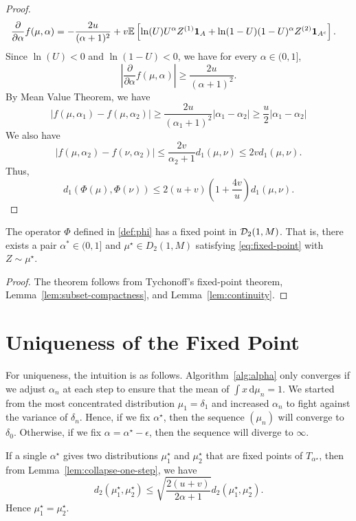 \begin{proof}
\begin{align*}
    \dfrac{\partial}{\partial \alpha} f(\mu, \alpha)
     & = -\dfrac{2u}{(\alpha+1)^2} + v\mathbb{E}\left[\ln(U) U^\alpha Z^{(1)} \mathbf{1}_A + \ln(1-U) (1-U)^\alpha Z^{(2)} \mathbf{1}_{A^c}\right].
  \end{align*}
  Since $\ln(U) < 0$ and $\ln(1-U) < 0$, we have for every $\alpha\in(0,1]$,
  $$\left|\dfrac{\partial}{\partial \alpha} f(\mu, \alpha)\right| \ge \dfrac{2u}{(\alpha+1)^2}.$$
  By Mean Value Theorem, we have
  $$|f(\mu, \alpha_1) - f(\mu, \alpha_2)| \ge \dfrac{2u}{(\alpha_1+1)^2}|\alpha_1 - \alpha_2|\ge \dfrac{u}{2}|\alpha_1 - \alpha_2|$$
  We also have
  $$|f(\mu, \alpha_2) - f(\nu, \alpha_2)| \le \dfrac{2v}{\alpha_2+1}d_1(\mu, \nu) \le 2v d_1(\mu, \nu).$$
  Thus,
  $$d_1(\Phi(\mu), \Phi(\nu)) \le 2(u+v)\left(1+\dfrac{4v}{u}\right)d_1(\mu, \nu).$$
\end{proof}

\begin{theorem}
  The operator $\Phi$ defined in \ref{def:phi} has a fixed point in $\mathcal{D}_2(1, M)$. That is, there exists a pair $\alpha^*\in (0,1]$ and $\mu^\star\in D_2(1,M)$ satisfying \eqref{eq:fixed-point} with $Z\sim\mu^\star$.
\end{theorem}

\begin{proof}
  The theorem follows from Tychonoff's fixed-point theorem, Lemma~\ref{lem:subset-compactness}, and Lemma~\ref{lem:continuity}.
\end{proof}

\section{Uniqueness of the Fixed Point}

For uniqueness, the intuition is as follows. Algorithm~\ref{alg:alpha} only converges if we adjust $\alpha_n$ at each step to ensure that the mean of $\int x\,\mathrm{d}\mu_n = 1$. We started from the most concentrated distribution $\mu_1 = \delta_1$ and increased $\alpha_n$ to fight against the variance of $\delta_n$. Hence, if we fix $\alpha^\star$, then the sequence $(\mu_n)$ will converge to $\delta_0$. Otherwise, if we fix $\alpha = \alpha^\star - \epsilon$, then the sequence will diverge to $\infty$.

If a single $\alpha^\star$ gives two distributions $\mu_1^\star$ and $\mu_2^\star$ that are fixed points of $T_{\alpha^\star}$, then from Lemma~\ref{lem:collapse-one-step}, we have
$$d_2(\mu_1^\star, \mu_2^\star) \le \sqrt{\dfrac{2(u+v)}{2\alpha+1}}d_2(\mu_1^\star, \mu_2^\star).$$
Hence $\mu_1^\star = \mu_2^\star$.


